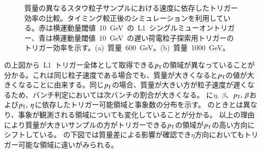 \begin{figure}[tbp]
\begin{minipage}{0.49\hsize}
    \subcaption{}
    \end{minipage}
    \caption[質量の異なるスタウ粒子サンプルにおける速度に依存したトリガー効率の比較]{質量の異なるスタウ粒子サンプルにおける速度に依存したトリガー効率の比較。タイミング較正後のシミュレーションを利用している。赤は横運動量閾値~10~GeV~の~L1~シングルミューオントリガー、青は横運動量閾値~10~GeV~の遅い荷電粒子探索用トリガーのトリガー効率を示す。(a)~質量~600~GeV。(b)~質量~1000~GeV。}\label{fig:tribeta6}
\end{figure}
の上図から~L1~トリガー全体として取得できる$p_{\rm{T}}$の領域が異なっていることが分かる。これは同じ粒子速度である場合でも、質量が大きくなると$p_{\rm{T}}$の値が大きくなることに由来する。同じ$p_{\rm{T}}$の場合、質量が大きい方が粒子速度が遅くなるため、バンチ判定においては次バンチの割合が大きくなる。
に$\eta,~\beta$、$p_{\rm{T}},~\beta$および$p_{\rm{T}},~\eta$に依存したトリガー可能領域と事象数の分布を示す。
のときとは異なり、事象が観測される領域についても変化していることが分かる。
以上の理由により質量が大きいサンプルの方がトリガーできる$p_{\rm{T}}$の領域が$p_{\rm{T}}$の高い方向にシフトしている。
の下図では質量差による影響が確認でき$\eta$方向においてもトリガー可能な領域に違いがみられる。

